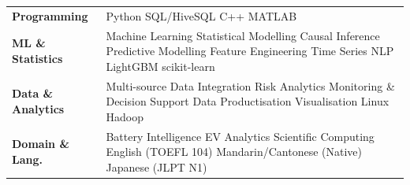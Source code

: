 \documentclass[a4paper,10pt]{article}
\begin{document}
\begin{tabular}{@{}p{3.0cm}p{12.5cm}@{}}
\textbf{Programming}      & Python \textperiodcentered{} SQL/HiveSQL \textperiodcentered{} C++ \textperiodcentered{} MATLAB \\[1pt]
\textbf{ML \& Statistics} & Machine Learning \textperiodcentered{} Statistical Modelling \textperiodcentered{} Causal Inference \textperiodcentered{} Predictive Modelling \textperiodcentered{} Feature Engineering \textperiodcentered{} Time Series \textperiodcentered{} NLP \textperiodcentered{} LightGBM \textperiodcentered{} scikit-learn \\[1pt]
\textbf{Data \& Analytics} & Multi-source Data Integration \textperiodcentered{} Risk Analytics \textperiodcentered{} Monitoring \& Decision Support \textperiodcentered{} Data Productisation \textperiodcentered{} Visualisation \textperiodcentered{} Linux \textperiodcentered{} Hadoop \\[1pt]
\textbf{Domain \& Lang.} & Battery Intelligence \textperiodcentered{} EV Analytics \textperiodcentered{} Scientific Computing \textperiodcentered{} English (TOEFL 104) \textperiodcentered{} Mandarin/Cantonese (Native) \textperiodcentered{} Japanese (JLPT N1) \\
\end{tabular}
\end{document}
